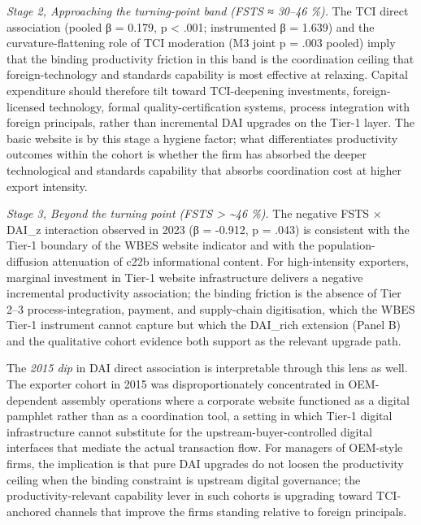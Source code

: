 \documentclass[12pt,a4paper]{article}
\begin{document}
\emph{Stage 2, Approaching the turning-point band (FSTS ≈ 30--46 \%).}
The TCI direct association (pooled β = 0.179, p \textless{} .001;
instrumented β = 1.639) and the curvature-flattening role of TCI
moderation (M3 joint p = .003 pooled) imply that the binding
productivity friction in this band is the coordination ceiling that
foreign-technology and standards capability is most effective at
relaxing. Capital expenditure should therefore tilt toward TCI-deepening
investments, foreign-licensed technology, formal quality-certification
systems, process integration with foreign principals, rather than
incremental DAI upgrades on the Tier-1 layer. The basic website is by
this stage a hygiene factor; what differentiates productivity outcomes
within the cohort is whether the firm has absorbed the deeper
technological and standards capability that absorbs coordination cost at
higher export intensity.

\emph{Stage 3, Beyond the turning point (FSTS \textgreater{}
\textasciitilde46 \%).} The negative FSTS × DAI\_z interaction observed
in 2023 (β = -0.912, p = .043) is consistent with the Tier-1 boundary of
the WBES website indicator and with the population-diffusion attenuation
of c22b informational content. For high-intensity exporters, marginal
investment in Tier-1 website infrastructure delivers a negative
incremental productivity association; the binding friction is the
absence of Tier 2--3 process-integration, payment, and supply-chain
digitisation, which the WBES Tier-1 instrument cannot capture but which
the DAI\_rich extension (Panel B) and the qualitative cohort evidence
both support as the relevant upgrade path.

The \emph{2015 dip} in DAI direct association is interpretable through
this lens as well. The exporter cohort in 2015 was disproportionately
concentrated in OEM-dependent assembly operations where a corporate
website functioned as a digital pamphlet rather than as a coordination
tool, a setting in which Tier-1 digital infrastructure cannot substitute
for the upstream-buyer-controlled digital interfaces that mediate the
actual transaction flow. For managers of OEM-style firms, the
implication is that pure DAI upgrades do not loosen the productivity
ceiling when the binding constraint is upstream digital governance; the
productivity-relevant capability lever in such cohorts is upgrading
toward TCI-anchored channels that improve the firm\textquotesingle s
standing relative to foreign principals.
\end{document}
